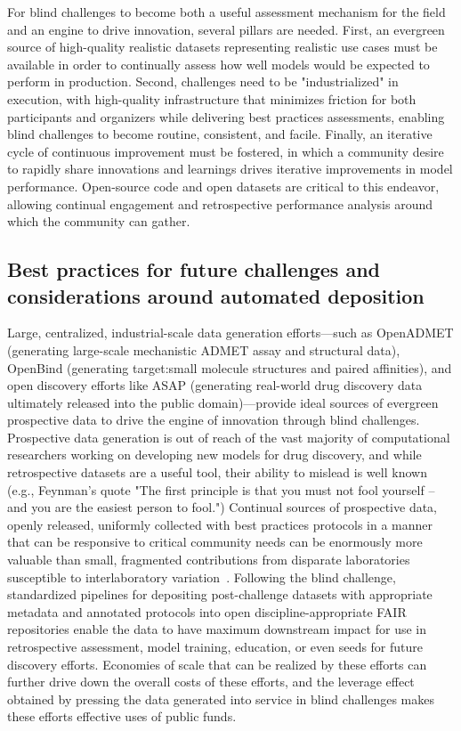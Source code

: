 \documentclass[journal=jcim,manuscript=article]{achemso}
\begin{document}
{For blind challenges to become both a useful assessment mechanism for the field and an engine to drive innovation, several pillars are needed. 
First, an evergreen source of high-quality realistic datasets representing realistic use cases must be available in order to continually assess how well models would be expected to perform in production. 
Second, challenges need to be "industrialized" in execution, with high-quality infrastructure that minimizes friction for both participants and organizers while delivering best practices assessments, enabling blind challenges to become routine, consistent, and facile. 
Finally, an iterative cycle of continuous improvement must be fostered, in which a community desire to rapidly share innovations and learnings drives iterative improvements in model performance. 
Open-source code and open datasets are critical to this endeavor, allowing continual engagement and retrospective performance analysis around which the community can gather. 

\subsection{Best practices for future challenges and considerations around automated deposition}

Large, centralized, industrial-scale data generation efforts---such as OpenADMET (generating large-scale mechanistic ADMET assay and structural data), OpenBind (generating target:small molecule structures and paired affinities), and open discovery efforts like ASAP (generating real-world drug discovery data ultimately released into the public domain)---provide ideal sources of evergreen prospective data to drive the engine of innovation through blind challenges.
Prospective data generation is out of reach of the vast majority of computational researchers working on developing new models for drug discovery, and while retrospective datasets are a useful tool, their ability to mislead is well known (e.g., Feynman's quote "The first principle is that you must not fool yourself -- and you are the easiest person to fool.")
Continual sources of prospective data, openly released, uniformly collected with best practices protocols in a manner that can be responsive to critical community needs can be enormously more valuable than small, fragmented contributions from disparate laboratories susceptible to interlaboratory variation~\cite{kramer2012experimental,kalliokoski2013comparability,landrum2024combining}.
Following the blind challenge, standardized pipelines for depositing post-challenge datasets with appropriate metadata and annotated protocols into open discipline-appropriate FAIR repositories enable the data to have maximum downstream impact for use in retrospective assessment, model training, education, or even seeds for future discovery efforts. 
Economies of scale that can be realized by these efforts can further drive down the overall costs of these efforts, and the leverage effect obtained by pressing the data generated into service in blind challenges makes these efforts effective uses of public funds.

}
\end{document}
